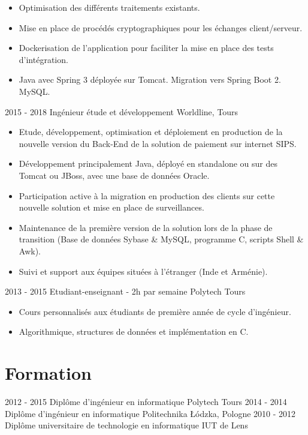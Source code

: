 \documentclass[]{friggeri-cv}
\begin{document}
\begin{entrylist}
{\begin{itemize}[leftmargin=*]
		\item Optimisation des différents traitements existants.
		\item Mise en place de procédés cryptographiques pour les échanges client/serveur.
		\item Dockerisation de l'application pour faciliter la mise en place des tests d'intégration.
		\item Java avec Spring 3 déployée sur Tomcat. Migration vers Spring Boot 2. MySQL.
	\end{itemize}
	}
      \entry
    {2015 - 2018}
    {Ingénieur étude et développement}
    {Worldline, Tours}
    {
    \vspace{-0.8\baselineskip}
    \begin{itemize}[leftmargin=*]
		\item Etude, développement, optimisation et déploiement en production de la nouvelle version du Back-End de la solution de paiement sur internet SIPS.
		\item Développement principalement Java, déployé en standalone ou sur des Tomcat ou JBoss,  avec une base de données Oracle.
		\item Participation active à la migration en production des clients sur cette nouvelle solution et mise en place de surveillances.
		\item Maintenance de la première version de la solution lors de la phase de transition (Base de données Sybase \& MySQL, programme C, scripts Shell \& Awk).
		\item Suivi et support aux équipes situées à l'étranger (Inde et Arménie).
	\end{itemize}
}
    \entry
    {2013 - 2015}
    {Etudiant-enseignant - 2h par semaine}
    {Polytech Tours}
    {
    \vspace{-0.8\baselineskip}
	\begin{itemize}[leftmargin=*]
		\item Cours personnalisés aux étudiants de première année de cycle d'ingénieur. 
		\item Algorithmique, structures de données et implémentation en C.
	\end{itemize}
    }
\end{entrylist}

\vspace{6pt}

\section{Formation}
\vspace{-5pt}
\begin{entrylist}
  \vspace{-8pt}
  \entry
    {2012 - 2015}
    {Diplôme d'ingénieur en informatique}
    {Polytech Tours}
    {}
  \vspace{-6pt}    
  \entry
    {2014 - 2014}
    {Diplôme d'ingénieur en informatique}
    {Politechnika Łódzka, Pologne}
    {}
  \entry
    {2010 - 2012}
    {Diplôme universitaire de technologie en informatique}
    {IUT de Lens}
    {}
\end{entrylist}
\end{document}

